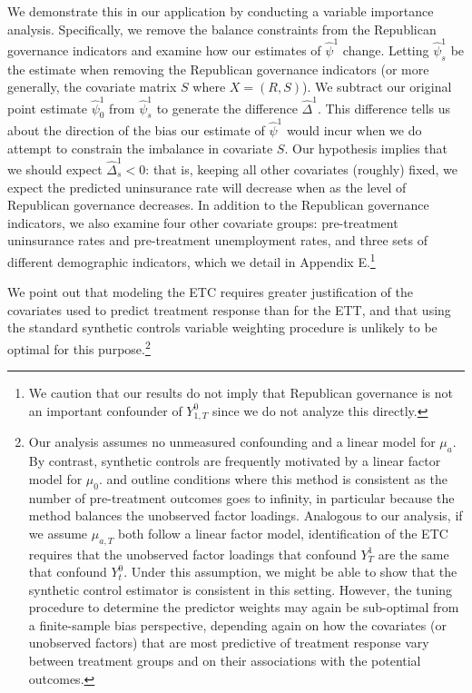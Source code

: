 We demonstrate this in our application by conducting a variable importance analysis. Specifically, we remove the balance constraints from the Republican governance indicators and examine how our estimates of $\hat{\psi}^1$ change. Letting $\hat{\psi}^1_s$ be the estimate when removing the Republican governance indicators (or more generally, the covariate matrix $S$ where $X = (R, S)$). We subtract our original point estimate $\hat{\psi}^1_0$ from $\hat{\psi}^1_s$ to generate the difference $\hat{\Delta}^1$. This difference tells us about the direction of the bias our estimate of $\hat{\psi}^1$ would incur when we do attempt to constrain the imbalance in covariate $S$. Our hypothesis implies that we should expect $\hat{\Delta}_s^1 < 0$: that is, keeping all other covariates (roughly) fixed, we expect the predicted uninsurance rate will decrease when as the level of Republican governance decreases. In addition to the Republican governance indicators, we also examine four other covariate groups: pre-treatment uninsurance rates and pre-treatment unemployment rates, and three sets of different demographic indicators, which we detail in Appendix E.\footnote{We caution that our results do not imply that Republican governance is not an important confounder of $Y^0_{1, T}$ since we do not analyze this directly.} 

We point out that modeling the ETC requires greater justification of the covariates used to predict treatment response than for the ETT, and that using the standard synthetic controls variable weighting procedure is unlikely to be optimal for this purpose.\footnote{Our analysis assumes no unmeasured confounding and a linear model for $\mu_a$. By contrast, synthetic controls are frequently motivated by a linear factor model for $\mu_0$. \cite{abadie2010synthetic} and \cite{ferman2016revisiting} outline conditions where this method is consistent as the number of pre-treatment outcomes goes to infinity, in particular because the method balances the unobserved factor loadings. Analogous to our analysis, if we assume $\mu_{a, T}$ both follow a linear factor model, identification of the ETC requires that the unobserved factor loadings that confound $Y^1_T$ are the same that confound $Y^0_t$. Under this assumption, we might be able to show that the synthetic control estimator is consistent in this setting. However, the tuning procedure to determine the predictor weights may again be sub-optimal from a finite-sample bias perspective, depending again on how the covariates (or unobserved factors) that are most predictive of treatment response vary between treatment groups and on their associations with the potential outcomes.}

